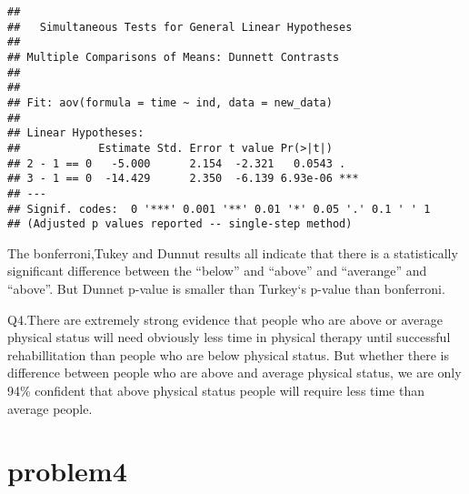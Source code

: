 \documentclass[]{article}
\begin{document}
\begin{verbatim}
## 
##   Simultaneous Tests for General Linear Hypotheses
## 
## Multiple Comparisons of Means: Dunnett Contrasts
## 
## 
## Fit: aov(formula = time ~ ind, data = new_data)
## 
## Linear Hypotheses:
##            Estimate Std. Error t value Pr(>|t|)    
## 2 - 1 == 0   -5.000      2.154  -2.321   0.0543 .  
## 3 - 1 == 0  -14.429      2.350  -6.139 6.93e-06 ***
## ---
## Signif. codes:  0 '***' 0.001 '**' 0.01 '*' 0.05 '.' 0.1 ' ' 1
## (Adjusted p values reported -- single-step method)
\end{verbatim}

The bonferroni,Tukey and Dunnut results all indicate that there is a
statistically significant difference between the ``below'' and ``above''
and ``averange'' and ``above''. But Dunnet p-value is smaller than
Turkey`s p-value than bonferroni.

Q4.There are extremely strong evidence that people who are above or
average physical status will need obviously less time in physical
therapy until successful rehabillitation than people who are below
physical status. But whether there is difference between people who are
above and average physical status, we are only 94\% confident that above
physical status people will require less time than average people.

\section{problem4}\label{problem4}
\end{document}
